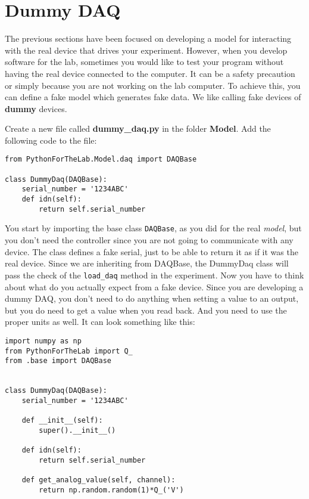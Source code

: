 \section{Dummy DAQ}\label{dummy-daq}
The previous sections have been focused on developing a model for interacting with the real device that drives your experiment. However, when you develop software for the lab, sometimes you would like to test your program without having the real device connected to the computer. It can be a safety precaution or simply because you are not working on the lab computer. To achieve this, you can define a fake model which generates fake data. We like calling fake devices of \textbf{dummy} devices. 

Create a new file called \textbf{dummy\_daq.py} in the folder \textbf{Model}. Add the following code to the file:

\begin{verbatim}
from PythonForTheLab.Model.daq import DAQBase

class DummyDaq(DAQBase):
    serial_number = '1234ABC'
    def idn(self):
        return self.serial_number
\end{verbatim}

You start by importing the base class \texttt{DAQBase}, as you did for the real \emph{model}, but you don't need the controller since you are not going to communicate with any device. The class defines a fake serial, just to be able to return it as if it was the real device. Since we are inheriting from DAQBase, the DummyDaq class will pass the check of the \texttt{load_daq} method in the experiment. Now you have to think about what do you actually expect from a fake device. Since you are developing a dummy {DAQ}, you don't need to do anything when setting a value to an output, but you do need to get a value when you read back. And you need to use the proper units as well. It can look something like this:

\begin{verbatim}
import numpy as np
from PythonForTheLab import Q_
from .base import DAQBase


class DummyDaq(DAQBase):
    serial_number = '1234ABC'
    
    def __init__(self):
        super().__init__()
    
    def idn(self):
        return self.serial_number
    
    def get_analog_value(self, channel):
        return np.random.random(1)*Q_('V')

\end{verbatim}

